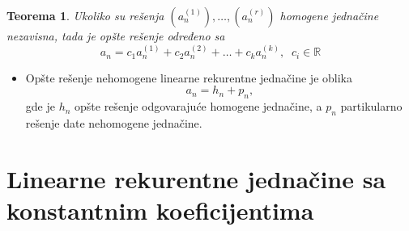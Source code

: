 \documentclass[a4paper,12pt]{article}
\numberwithin{algorithm}{section}
\theoremstyle{plain}
\newtheorem{theorem}{Teorema}[section]
\theoremstyle{definition}
\theoremstyle{remark}
\begin{document}
\begin{theorem}
    Ukoliko su rešenja $(a_n^{(1)}), \ldots, (a_n^{(r)})$ homogene jednačine nezavisna, tada je opšte rešenje određeno sa
    \[ a_n = c_1a_n^{(1)} + c_2a_n^{(2)} + \ldots + c_ka_n^{(k)}, \;\; c_i \in \mathbb{R} \]
\end{theorem}
\begin{itemize}
    \item Opšte rešenje nehomogene linearne rekurentne jednačine je oblika 
    \[
        a_n = h_n + p_n,
    \]
    gde je $h_n$ opšte rešenje odgovarajuće homogene jednačine, a $p_n$ partikularno rešenje date nehomogene jednačine.
\end{itemize}

\newpage
\section{Linearne rekurentne jednačine sa konstantnim koeficijentima}
\end{document}
